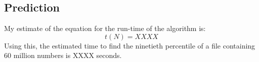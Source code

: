 \documentclass{article}
\begin{document}

\subsection{Prediction}
\label{sec:prediction2}

My estimate of the equation for the run-time of the algorithm is:
\begin{equation}
  \label{eq:estimated_runtime2}
  t(N) = XXXX
\end{equation}
Using this, the estimated time to find the ninetieth percentile of a
file containing 60 million numbers is XXXX seconds.
\end{document}
